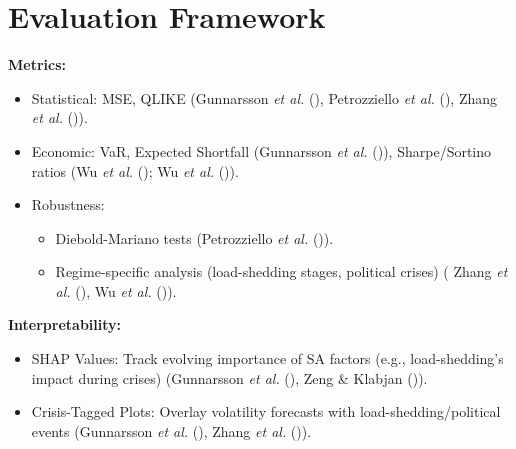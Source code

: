 \documentclass[11pt,preprint]{elsarticle}
\numberwithin{equation}{section}
\numberwithin{figure}{section}
\numberwithin{table}{section}
\def\tightlist{} %
\begin{document}
\section{Evaluation Framework}\label{evaluation-framework}

\textbf{Metrics:}

\begin{itemize}
\tightlist
\item
  Statistical: MSE, QLIKE (Gunnarsson \emph{et al.}
  (), Petrozziello \emph{et
  al.} (), Zhang \emph{et
  al.} ()).\\
\item
  Economic: VaR, Expected Shortfall (Gunnarsson \emph{et al.}
  ()), Sharpe/Sortino ratios
  (Wu \emph{et al.} (); Wu
  \emph{et al.} ()).\\
\item
  Robustness:

  \begin{itemize}
  \tightlist
  \item
    Diebold-Mariano tests (Petrozziello \emph{et al.}
    ()).\\
  \item
    Regime-specific analysis (load-shedding stages, political crises) (
    Zhang \emph{et al.} (),
    Wu \emph{et al.} ()).
  \end{itemize}
\end{itemize}

\textbf{Interpretability:}

\begin{itemize}
\tightlist
\item
  SHAP Values: Track evolving importance of SA factors (e.g.,
  load-shedding's impact during crises) (Gunnarsson \emph{et al.}
  (), Zeng \& Klabjan
  ()).\\
\item
  Crisis-Tagged Plots: Overlay volatility forecasts with
  load-shedding/political events (Gunnarsson \emph{et al.}
  (), Zhang \emph{et al.}
  ()).
\end{itemize}
\end{document}

